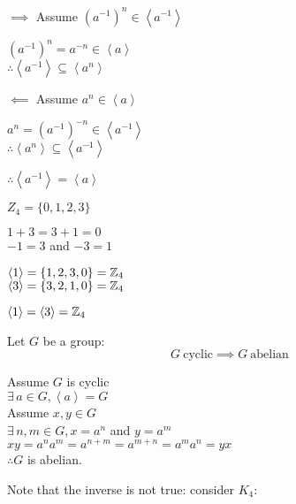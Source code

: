 \documentclass[letterpaper,12pt,fleqn]{article}
\newcommand{\cycle}[1]{\left<#1\right>}
\begin{document}
\begin{theproof}
  \listbreak
  \begin{description}
  \item{$\implies$ Assume $(a^{-1})^n\in\cycle{a^{-1}}$}

    $(a^{-1})^n=a^{-n}\in\cycle{a}$ \\
    $\therefore\cycle{a^{-1}}\subseteq\cycle{a^n}$
\newpage
  \item{$\impliedby$ Assume $a^n\in\cycle{a}$}

    $a^n=(a^{-1})^{-n}\in\cycle{a^{-1}}$ \\
    $\therefore\cycle{a^n}\subseteq\cycle{a^{-1}}$

  \end{description}

  $\therefore\cycle{a^{-1}}=\cycle{a}$
\end{theproof}

\begin{example}
  $Z_4=\{0,1,2,3\}$
  
  $1+3=3+1=0$ \\
  $-1=3$ and $-3=1$

  $\cycle{1}=\{1,2,3,0\}=\Z_4$ \\
  $\cycle{3}=\{3,2,1,0\}=\Z_4$

  $\cycle{1}=\cycle{3}=\Z_4$
\end{example}

\begin{theorem}
  Let $G$ be a group:
  \[G\ \mbox{cyclic}\implies G\ \mbox{abelian}\]
\end{theorem}

\begin{theproof}
  Assume $G$ is cyclic \\
  $\exists\,a\in G,\cycle{a}=G$ \\
  Assume $x,y\in G$ \\
  $\exists\,n,m\in G,x=a^n$ and $y=a^m$ \\
  $xy=a^na^m=a^{n+m}=a^{m+n}=a^ma^n=yx$ \\
  $\therefore G$ is abelian.
\end{theproof}

Note that the inverse is not true: consider $K_4$:
\end{document}
